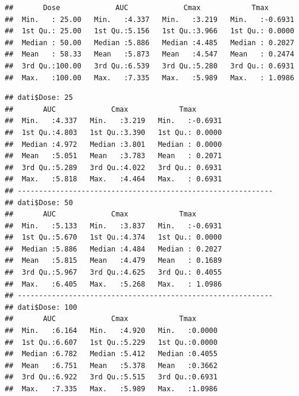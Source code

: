 \documentclass[
]{article}
\newenvironment{Shaded}{\begin{snugshade}}{\end{snugshade}}
\newcommand{\DecValTok}[1]{\textcolor[rgb]{0.00,0.00,0.81}{#1}}
\newcommand{\FunctionTok}[1]{\textcolor[rgb]{0.00,0.00,0.00}{#1}}
\newcommand{\NormalTok}[1]{#1}
\newcommand{\SpecialCharTok}[1]{\textcolor[rgb]{0.00,0.00,0.00}{#1}}
\begin{document}
\begin{verbatim}
##       Dose             AUC             Cmax            Tmax        
##  Min.   : 25.00   Min.   :4.337   Min.   :3.219   Min.   :-0.6931  
##  1st Qu.: 25.00   1st Qu.:5.156   1st Qu.:3.966   1st Qu.: 0.0000  
##  Median : 50.00   Median :5.886   Median :4.485   Median : 0.2027  
##  Mean   : 58.33   Mean   :5.873   Mean   :4.547   Mean   : 0.2474  
##  3rd Qu.:100.00   3rd Qu.:6.539   3rd Qu.:5.280   3rd Qu.: 0.6931  
##  Max.   :100.00   Max.   :7.335   Max.   :5.989   Max.   : 1.0986
\end{verbatim}

\begin{Shaded}
\end{Shaded}

\begin{verbatim}
## dati$Dose: 25
##       AUC             Cmax            Tmax        
##  Min.   :4.337   Min.   :3.219   Min.   :-0.6931  
##  1st Qu.:4.803   1st Qu.:3.390   1st Qu.: 0.0000  
##  Median :4.972   Median :3.801   Median : 0.0000  
##  Mean   :5.051   Mean   :3.783   Mean   : 0.2071  
##  3rd Qu.:5.289   3rd Qu.:4.022   3rd Qu.: 0.6931  
##  Max.   :5.818   Max.   :4.464   Max.   : 0.6931  
## ------------------------------------------------------------ 
## dati$Dose: 50
##       AUC             Cmax            Tmax        
##  Min.   :5.133   Min.   :3.837   Min.   :-0.6931  
##  1st Qu.:5.670   1st Qu.:4.374   1st Qu.: 0.0000  
##  Median :5.886   Median :4.484   Median : 0.2027  
##  Mean   :5.815   Mean   :4.479   Mean   : 0.1689  
##  3rd Qu.:5.967   3rd Qu.:4.625   3rd Qu.: 0.4055  
##  Max.   :6.405   Max.   :5.268   Max.   : 1.0986  
## ------------------------------------------------------------ 
## dati$Dose: 100
##       AUC             Cmax            Tmax       
##  Min.   :6.164   Min.   :4.920   Min.   :0.0000  
##  1st Qu.:6.607   1st Qu.:5.229   1st Qu.:0.0000  
##  Median :6.782   Median :5.412   Median :0.4055  
##  Mean   :6.751   Mean   :5.378   Mean   :0.3662  
##  3rd Qu.:6.922   3rd Qu.:5.515   3rd Qu.:0.6931  
##  Max.   :7.335   Max.   :5.989   Max.   :1.0986
\end{verbatim}
\end{document}
